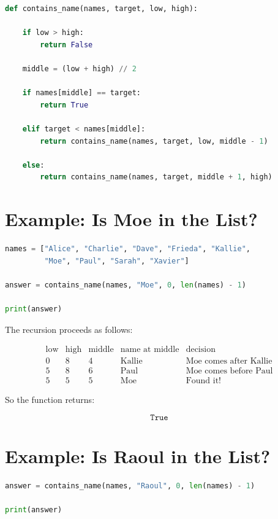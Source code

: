 \documentclass[11pt]{article}
\begin{document}
\begin{lstlisting}[language=Python]
def contains_name(names, target, low, high):

    if low > high:
        return False

    middle = (low + high) // 2

    if names[middle] == target:
        return True

    elif target < names[middle]:
        return contains_name(names, target, low, middle - 1)

    else:
        return contains_name(names, target, middle + 1, high)
\end{lstlisting}

\section{Example: Is Moe in the List?}

\begin{lstlisting}[language=Python]
names = ["Alice", "Charlie", "Dave", "Frieda", "Kallie",
         "Moe", "Paul", "Sarah", "Xavier"]

answer = contains_name(names, "Moe", 0, len(names) - 1)

print(answer)
\end{lstlisting}

The recursion proceeds as follows:

\[
\begin{array}{c|c|c|c|c}
\text{low} & \text{high} & \text{middle} & \text{name at middle} & \text{decision} \\
\hline
0 & 8 & 4 & \text{Kallie} & \text{Moe comes after Kallie} \\
5 & 8 & 6 & \text{Paul} & \text{Moe comes before Paul} \\
5 & 5 & 5 & \text{Moe} & \text{Found it!}
\end{array}
\]

So the function returns:

\[
\texttt{True}
\]

\section{Example: Is Raoul in the List?}

\begin{lstlisting}[language=Python]
answer = contains_name(names, "Raoul", 0, len(names) - 1)

print(answer)
\end{lstlisting}
\end{document}
